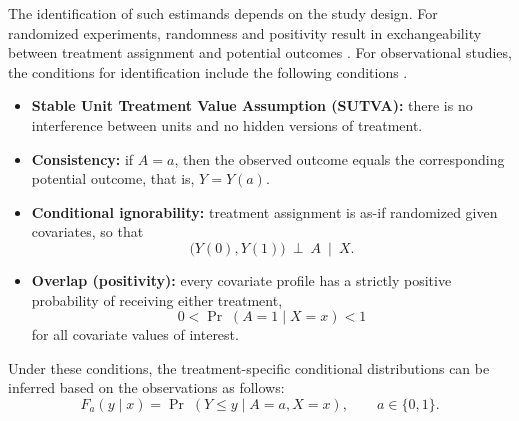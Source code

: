 \documentclass[article]{jss}\usepackage[]{graphicx}\usepackage[]{xcolor}
\begin{document}
The identification of such estimands depends on the study design. For randomized experiments, randomness and positivity result in exchangeability between treatment assignment and potential outcomes \citep{ImbensRubin2015}. For observational studies, the conditions for identification include the following conditions \citep{RosenbaumRubin1983,ImbensRubin2015}.

\begin{itemize}
\item \textbf{Stable Unit Treatment Value Assumption (SUTVA):} there
is no interference between units and no hidden versions of treatment.
\item \textbf{Consistency:} if $A=a$, then the observed outcome equals
the corresponding potential outcome, that is, $Y=Y(a)$.
\item \textbf{Conditional ignorability:} treatment assignment is
as-if randomized given covariates, so that
\begin{equation*}
\bigl(Y(0),Y(1)\bigr)\ \perp\ A \ \mid\ X.
\end{equation*}
\item \textbf{Overlap (positivity):} every covariate profile has a
strictly positive probability of receiving either treatment,
\begin{equation*}
0<\Pr\;(A=1\mid X=x)<1
\end{equation*}
for all covariate values of interest.
\end{itemize}
Under these conditions, the treatment-specific conditional
distributions can be inferred based on the observations as follows:
\begin{equation*}
F_a(y\mid x)=\Pr\;(Y\le y\mid A=a,X=x),\qquad a\in\{0,1\}.
\end{equation*}
\end{document}
